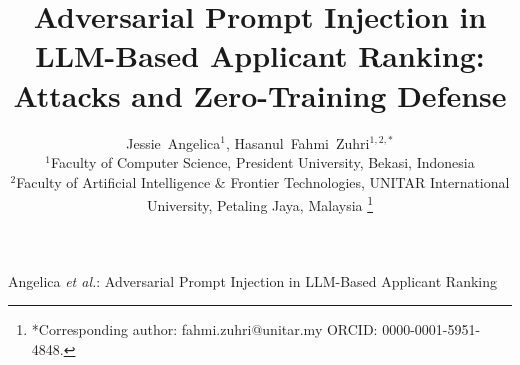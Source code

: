 \documentclass[journal]{IEEEtran}
\begin{document}
\title{Adversarial Prompt Injection in LLM-Based Applicant Ranking: Attacks and Zero-Training Defense}

\author{Jessie~Angelica$^{1}$, Hasanul~Fahmi~Zuhri$^{1,2,*}$\\[0.5em]
{\normalsize $^{1}$Faculty of Computer Science, President University, Bekasi, Indonesia\\
$^{2}$Faculty of Artificial Intelligence \& Frontier Technologies, UNITAR International University, Petaling Jaya, Malaysia}%
\thanks{*Corresponding author: fahmi.zuhri@unitar.my \; ORCID: 0000-0001-5951-4848.}}

%
{Angelica \MakeLowercase{\textit{et al.}}: Adversarial Prompt Injection in LLM-Based Applicant Ranking}

\maketitle
\end{document}
